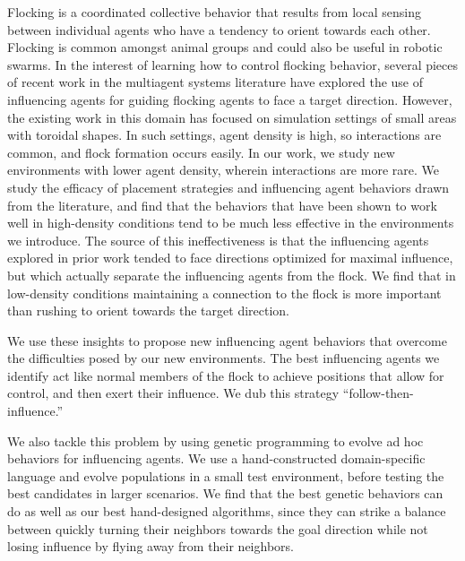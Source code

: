 
Flocking is a coordinated collective behavior that results from local sensing
between individual agents who have a tendency to orient towards each other.
Flocking is common amongst animal groups and could also be useful in robotic
swarms.
In the interest of learning how to control flocking behavior, several pieces
of recent work in the multiagent systems literature have explored the use of
influencing agents for guiding flocking agents to face a target direction.
However, the existing work in this domain has focused on simulation settings
of small areas with toroidal shapes.
In such settings, agent density is high, so interactions are common, and
flock formation occurs easily.
In our work, we study new environments with lower agent density, wherein
interactions are more rare.
We study the efficacy of placement strategies and influencing agent behaviors
drawn from the literature, and find that the behaviors that have been shown to
work well in high-density conditions tend to be much less effective in the
environments we introduce.
The source of this ineffectiveness is that the influencing agents explored in
prior work tended to face directions optimized for maximal influence, but which
actually separate the influencing agents from the flock.
We find that in low-density conditions maintaining a connection to the flock is
more important than rushing to orient towards the target direction.

We use these insights to propose new influencing agent behaviors that overcome
the difficulties posed by our new environments.
The best influencing agents we identify act like normal members of the flock to
achieve positions that allow for control, and then exert their influence.  
We dub this strategy ``follow-then-influence.''

We also tackle this problem by using genetic programming to evolve ad hoc
behaviors for influencing agents.
We use a hand-constructed domain-specific language and evolve populations in
a small test environment, before testing the best candidates in larger
scenarios.
We find that the best genetic behaviors can do as well as our best
hand-designed algorithms, since they can strike a balance between quickly
turning their neighbors towards the goal direction while not losing influence
by flying away from their neighbors.
